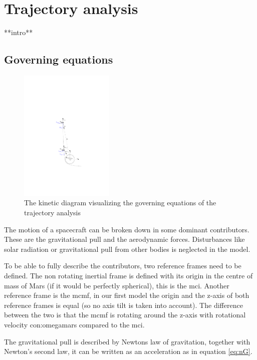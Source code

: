\section{Trajectory analysis} \label{ch:trajectory}

**intro**

\subsection{Governing equations}\label{sec:gov}

\begin{figure}
		\centering
		\includegraphics[width = 0.4\textwidth]{Figure/orbital_mechanics.pdf}
		\caption{The kinetic diagram visualizing the governing equations of the trajectory analysis}
		\label{fig:orb}
\end{figure}

The motion of a spacecraft can be broken down in some dominant contributors. These are the gravitational pull and the aerodynamic forces. Disturbances like solar radiation or gravitational pull from other bodies is neglected in the model.

To be able to fully describe the contributors, two reference frames need to be defined. The non rotating inertial frame is defined with its origin in the centre of mass of Mars (if it would be perfectly spherical), this is the \gls{mci}. 
Another reference frame is the \gls{mcmf}, in our first model the origin and the z-axis of both reference frames is equal (so no axis tilt is taken into account). The difference between the two is that the \gls{mcmf} is rotating around the z-axis with rotational velocity \gls{con:omegamars} compared to the \gls{mci}.

The gravitational pull is described by Newtons law of gravitation, together with Newton's second law, it can be written as an acceleration as in equation \ref{eq:nG}.

